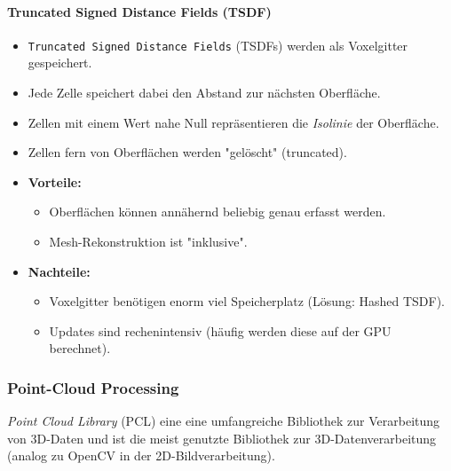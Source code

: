 \documentclass[a4paper, 11pt, accentcolor = tud3b]{tudreport}
\begin{document}
					\paragraph{Truncated Signed Distance Fields (TSDF)}
						\begin{itemize}
							\item \texttt{Truncated Signed Distance Fields} (TSDFs) werden als Voxelgitter gespeichert.
							\item Jede Zelle speichert dabei den Abstand zur nächsten Oberfläche.
							\item Zellen mit einem Wert nahe Null repräsentieren die \emph{Isolinie} der Oberfläche.
							\item Zellen fern von Oberflächen werden "gelöscht" (truncated).
							\item \textbf{Vorteile:}
								\begin{itemize}
									\item Oberflächen können annähernd beliebig genau erfasst werden.
									\item Mesh-Rekonstruktion ist "inklusive".
								\end{itemize}
							\item \textbf{Nachteile:}
								\begin{itemize}
									\item Voxelgitter benötigen enorm viel Speicherplatz (Lösung: Hashed TSDF).
									\item Updates sind rechenintensiv (häufig werden diese auf der GPU berechnet).
								\end{itemize}
						\end{itemize}

				\subsubsection{Point-Cloud Processing}
					\emph{Point Cloud Library} (PCL) eine eine umfangreiche Bibliothek zur Verarbeitung von 3D-Daten und ist die meist genutzte Bibliothek zur 3D-Datenverarbeitung (analog zu OpenCV in der 2D-Bildverarbeitung).
					
\end{document}
